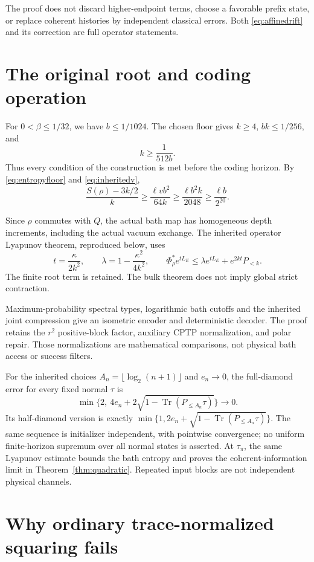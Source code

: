 \documentclass[11pt]{article}
\newcommand{\Tr}{\operatorname{Tr}}
\begin{document}
The proof does not discard higher-endpoint terms, choose a favorable
prefix state, or replace coherent histories by independent classical errors.
Both \eqref{eq:affinedrift} and its correction are full operator statements.

\section{The original root and coding operation}

For \(0<\beta\le1/32\), we have \(b\le1/1024\). The chosen floor
gives \(k\ge4\), \(bk\le1/256\), and
\[
 k\ge\frac1{512b}.
\]
Thus every condition of the construction is met before the coding horizon.
By \eqref{eq:entropyfloor} and \eqref{eq:inheritedv},
\[
 \frac{S(\rho)-3k/2}{k}
 \ge\frac{\ell vb^2}{64k}
 \ge\frac{\ell b^2k}{2048}
 \ge\frac{\ell b}{2^{20}}.
\]

Since \(\rho\) commutes with \(Q\), the actual bath map has homogeneous
depth increments, including the actual vacuum exchange. The inherited
operator Lyapunov theorem, reproduced below, uses
\[
 t=\frac{\kappa}{2k^2},\qquad
 \lambda=1-\frac{\kappa^2}{4k^2},\qquad
 \Phi_\rho^*e^{tL_E}
 \le\lambda e^{tL_E}+e^{2kt}P_{<k}.
\]
The finite root term is retained. The bulk theorem does not imply global
strict contraction.

Maximum-probability spectral types, logarithmic bath cutoffs and the
inherited joint compression give an isometric encoder and deterministic
decoder. The proof retains the \(r^2\) positive-block factor, auxiliary
CPTP normalization, and polar repair. Those normalizations are mathematical
comparisons, not physical bath access or success filters.

For the inherited choices \(A_n=\lfloor\log_2(n+1)\rfloor\) and
\(e_n\to0\), the full-diamond error for every fixed normal \(\tau\) is
\[
 \min\{2,\ 4e_n+2\sqrt{1-\Tr(P_{\le A_n}\tau)}\}\longrightarrow0.
\]
Its half-diamond version is exactly
\(\min\{1,2e_n+\sqrt{1-\Tr(P_{\le A_n}\tau)}\}\).
The same sequence is initializer independent, with pointwise convergence;
no uniform finite-horizon supremum over all normal states is asserted.
At \(\tau_\pi\), the same Lyapunov estimate bounds the bath entropy and
proves the coherent-information limit in Theorem~\ref{thm:quadratic}.
Repeated input blocks are not independent physical channels.

\section{Why ordinary trace-normalized squaring fails}\label{sec:rawsquare}
\end{document}
